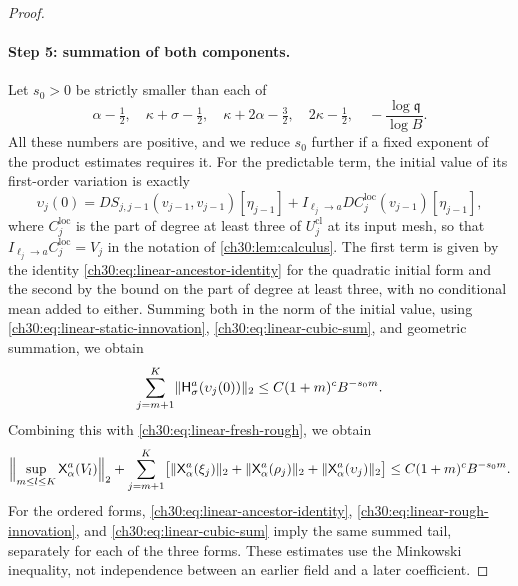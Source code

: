 \begin{proof}
\paragraph{Step 5: summation of both components.} Let $s_0>0$ be strictly smaller than each of
\[
 \alpha-\tfrac12,\quad\kappa+\sigma-\tfrac12,\quad\kappa+2\alpha-\tfrac32,\quad2\kappa-\tfrac12,\quad-\frac{\log\mathfrak q}{\log B}.
\]
All these numbers are positive, and we reduce $s_0$ further if a fixed exponent of the product estimates requires it. For the predictable term, the initial value of its first-order variation is exactly
\[
 \upsilon_j(0)=DS_{j,j-1}(v_{j-1},v_{j-1})[\eta_{j-1}]+I_{\ell_j\to a}DC_j^{\mathrm{loc}}(v_{j-1})[\eta_{j-1}],
\]
where $C_j^{\mathrm{loc}}$ is the part of degree at least three of $U_j^{\mathrm{cl}}$ at its input mesh, so that $I_{\ell_j\to a}C_j^{\mathrm{loc}}=V_j$ in the notation of \cref{ch30:lem:calculus}. The first term is given by the identity \eqref{ch30:eq:linear-ancestor-identity} for the quadratic initial form and the second by the bound on the part of degree at least three, with no conditional mean added to either. Summing both in the norm of the initial value, using \eqref{ch30:eq:linear-static-innovation}, \eqref{ch30:eq:linear-cubic-sum}, and geometric summation, we obtain
\begin{equation}\label{ch30:eq:linear-smoother-tail}
 \sum_{j=m+1}^K\lVert \mathsf H_\sigma^a(\upsilon_j(0))\rVert_2\le C(1+m)^cB^{-s_0m}.
\end{equation}
Combining this with \eqref{ch30:eq:linear-fresh-rough}, we obtain
\begin{equation}\label{ch30:eq:linear-first-tail}
 \Bigl\lVert\sup_{m\le l\le K}\mathsf X_\alpha^a(V_l)\Bigr\rVert_2+\sum_{j=m+1}^K\bigl[\lVert \mathsf X_\alpha^a(\xi_j)\rVert_2+\lVert \mathsf X_\alpha^a(\rho_j)\rVert_2+\lVert \mathsf X_\alpha^a(\upsilon_j)\rVert_2\bigr]\le C(1+m)^cB^{-s_0m}.
\end{equation}
For the ordered forms, \eqref{ch30:eq:linear-ancestor-identity}, \eqref{ch30:eq:linear-rough-innovation}, and \eqref{ch30:eq:linear-cubic-sum} imply the same summed tail, separately for each of the three forms. These estimates use the Minkowski inequality, not independence between an earlier field and a later coefficient.


\end{proof}
